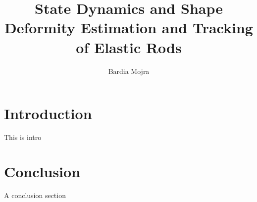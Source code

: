 \documentclass[journal,twoside,web]{ieeecolor}
\title{State Dynamics and Shape Deformity Estimation and Tracking of Elastic Rods}
\author{Bardia Mojra\\}
\begin{document}
\maketitle






\begin{abstract}


\end{abstract}


\section{Introduction}
\label{sec:introduction}
This is intro






\section{Conclusion}
A conclusion section


\end{document}
